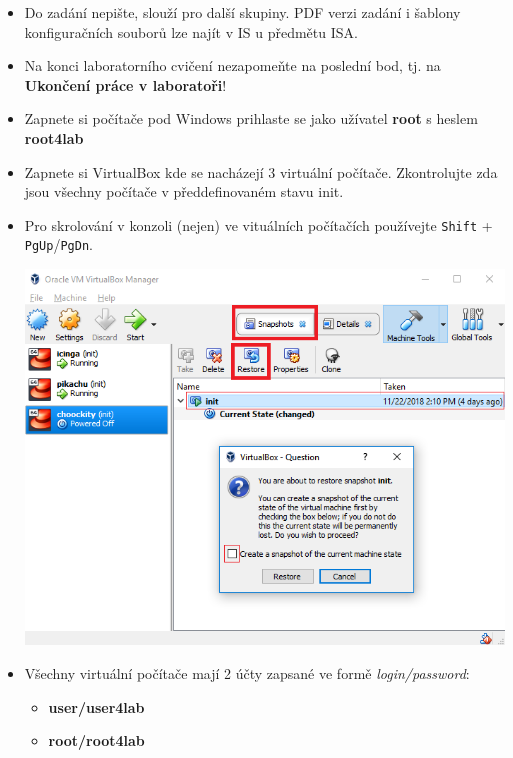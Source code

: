\begin{itemize}
  \item Do zadání nepište, slouží pro další skupiny. PDF verzi zadání
  i šablony konfiguračních souborů lze najít v IS u předmětu ISA.
  
  \item Na konci laboratorního cvičení nezapomeňte na poslední bod,
  tj. na {\bf Ukončení práce v laboratoři}!
  
  \item Zapnete si počítače pod Windows prihlaste se jako užívatel \textbf{root} s heslem \textbf{root4lab}
  \item Zapnete si VirtualBox kde se nacházejí 3 virtuální počítače. Zkontrolujte zda jsou všechny počítače v předdefinovaném stavu init.
  \item Pro skrolování v konzoli (nejen) ve vituálních počítačích používejte
    \texttt{Shift} + \texttt{PgUp}/\texttt{PgDn}.
  
  \includegraphics[width=\linewidth]{files/init.PNG}
  \item Všechny virtuální počítače mají 2 účty zapsané ve formě \textit{login/password}:
            \begin{itemize}
                \item \textbf{user/user4lab}
                \item \textbf{root/root4lab}
            \end{itemize}
\end{itemize}

\newpage
